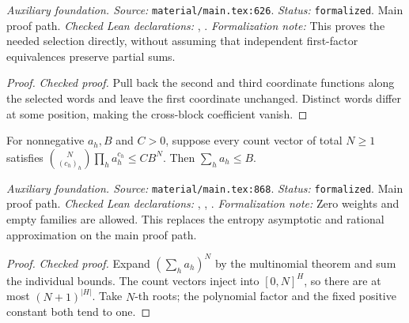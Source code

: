 \noindent\textit{Auxiliary foundation. Source:} \texttt{material/main.tex:626}.
\textit{Status:} \texttt{formalized}. Main proof path.
\textit{Checked Lean declarations:} , .
\textit{Formalization note:} This proves the needed selection directly, without assuming that independent first-factor equivalences preserve partial sums.

\begin{proof}
\leanok
{}
\textit{Checked proof.} Pull back the second and third coordinate functions along the selected words and leave the first coordinate unchanged. Distinct words differ at some position, making the cross-block coefficient vanish.
\end{proof}

\renewcommand{\thetheorem}{A70}
\begin{lemma}
\label{aux:multinomial-sum-bound}
\leanok
For nonnegative $a_h,B$ and $C>0$, suppose every count vector of total $N\ge1$ satisfies $\binom{N}{(c_h)_h}\prod_h a_h^{c_h}\le C B^N$. Then $\sum_h a_h\le B$.
\end{lemma}

\noindent\textit{Auxiliary foundation. Source:} \texttt{material/main.tex:868}.
\textit{Status:} \texttt{formalized}. Main proof path.
\textit{Checked Lean declarations:} , , .
\textit{Formalization note:} Zero weights and empty families are allowed. This replaces the entropy asymptotic and rational approximation on the main proof path.

\begin{proof}
\leanok
{}
\textit{Checked proof.} Expand $(\sum_h a_h)^N$ by the multinomial theorem and sum the individual bounds. The count vectors inject into $[0,N]^H$, so there are at most $(N+1)^{|H|}$. Take $N$-th roots; the polynomial factor and the fixed positive constant both tend to one.
\end{proof}

